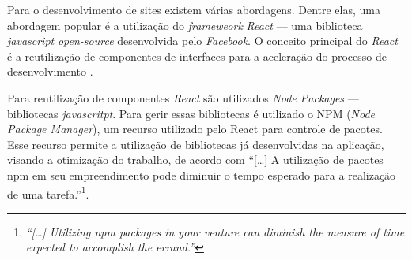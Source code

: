 Para o desenvolvimento de sites existem várias abordagens. Dentre elas, uma abordagem popular é a utilização do \textit{frameweork} \textit{React} — uma biblioteca \textit{javascript} \textit{open-source} desenvolvida pelo \textit{Facebook}. O conceito principal do \textit{React} é a reutilização de componentes de interfaces para a aceleração do processo de desenvolvimento \cite{rawat2020react}.

Para reutilização de componentes \textit{React} são utilizados \textit{Node Packages} — bibliotecas \textit{javascritpt}. Para gerir essas bibliotecas é utilizado o NPM (\textit{Node Package Manager}), um recurso utilizado pelo React para controle de pacotes. Esse recurso permite a utilização de bibliotecas já desenvolvidas na aplicação, visando a otimização do trabalho, de acordo com  ``[\dots] A utilização de pacotes npm em seu empreendimento pode diminuir o tempo esperado para a realização de uma tarefa.''\footnote{\textit{``[\dots] Utilizing npm packages in your venture can diminish the measure of time expected to accomplish the errand.''}}\cite[p.699, tradução nossa]{rawat2020react}.



